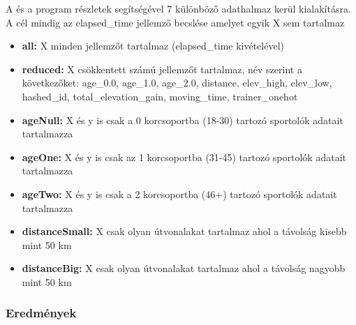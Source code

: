 A  és a  program részletek segítségével 7 különböző adathalmaz kerül kialakításra. A cél mindig az elapsed\_time jellemző becslése amelyet egyik X sem tartalmaz
\begin{itemize}
	\item \textbf{all:} X minden jellemzőt tartalmaz (elapsed\_time kivételével)
	\item \textbf{reduced:} X csökkentett számú jellemzőt tartalmaz, név szerint a következőket: age\_0.0, age\_1.0, age\_2.0, distance, elev\_high, elev\_low, hashed\_id, total\_elevation\_gain, moving\_time, trainer\_onehot
	\item \textbf{ageNull:} X és y is csak a 0 korcsoportba (18-30) tartozó sportolók adatait tartalmazza 
	\item \textbf{ageOne:} X és y is csak az 1 korcsoportba (31-45) tartozó sportolók adatait tartalmazza
	\item \textbf{ageTwo:} X és y is csak a 2 korcsoportba (46+) tartozó sportolók adatait tartalmazza
	\item \textbf{distanceSmall:} X csak olyan útvonalakat tartalmaz ahol a távolság kisebb mint 50 km
	\item \textbf{distanceBig:} X csak olyan útvonalakat tartalmaz ahol a távolság nagyobb mint 50 km
	
\end{itemize}



\subsubsection{Eredmények}

